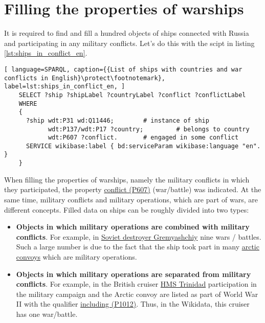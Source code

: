 \section{Filling the properties of warships}

It is required to find and fill a hundred objects of ships connected with Russia and participating in any military conflicts. Let's do this with the scipt in listing \ref{lst:ships_in_conflict_en}.
\begin{lstlisting}[ language=SPARQL, caption={{List of ships with countries and war conflicts in English}\protect\footnotemark}, label=lst:ships_in_conflict_en, ]
    SELECT ?ship ?shipLabel ?countryLabel ?conflict ?conflictLabel
    WHERE
    {
      ?ship wdt:P31 wd:Q11446;        # instance of ship
            wdt:P137/wdt:P17 ?country;         # belongs to country
            wdt:P607 ?conflict.       # engaged in some conflict
      SERVICE wikibase:label { bd:serviceParam wikibase:language "en". }
    }
\end{lstlisting}

When filling the properties of warships, namely the military conflicts in which they participated, the property \href{https://www.wikidata.org/wiki/Property:P607}{conflict (P607)} (war/battle) was indicated. At the same time, military conflicts and military operations, which are part of wars, are different concepts. Filled data on ships can be roughly divided into two types:
\begin{itemize}
  \item \textbf{Objects in which military operations are combined with military conflicts}. For example, in \href{https://www.wikidata.org/wiki/Q4148613}{Soviet destroyer Gremyashchiy} nine wars / battles. Such a large number is due to the fact that the ship took part in many \href{https://en.wikipedia.org/wiki/Arctic_convoys_of_World_War_II}{arctic convoys} which are military operations.
  \item \textbf{Objects in which military operations are separated from military conflicts}. For example, in the British cruiser \href{https://en.wikipedia.org/wiki/HMS_Trinidad_(1940)}{HMS Trinidad} participation in the military campaign and the Arctic convoy are listed as part of World War II with the qualifier \href{https://www.wikidata.org/wiki/Property:P1012}{including (P1012)}. Thus, in the Wikidata, this cruiser has one war/battle.
\end{itemize}

